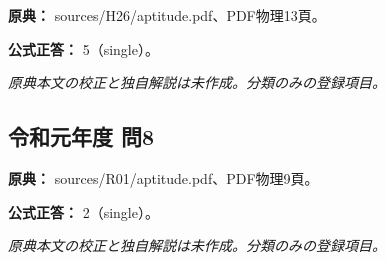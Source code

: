 \noindent\textbf{原典：} sources/H26/aptitude.pdf、PDF物理13頁。

\textbf{公式正答：} 5（single）。

\par\textit{原典本文の校正と独自解説は未作成。分類のみの登録項目。}

\subsection{令和元年度 問8}
\label{q:r01-reg-apt-08}

\noindent\textbf{原典：} sources/R01/aptitude.pdf、PDF物理9頁。

\textbf{公式正答：} 2（single）。

\par\textit{原典本文の校正と独自解説は未作成。分類のみの登録項目。}
